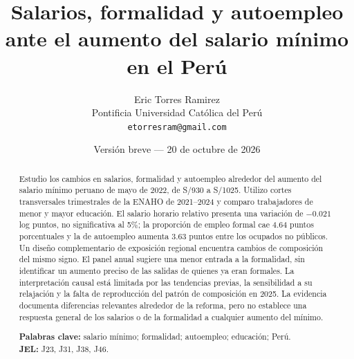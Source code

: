 \documentclass[12pt]{article}
\title{\textbf{Salarios, formalidad y autoempleo ante el aumento del salario mínimo en el Perú}}
\author{Eric Torres Ramirez\\\small Pontificia Universidad Católica del Perú\\\small\texttt{etorresram@gmail.com}}
\date{Versión breve --- 20 de octubre de 2026}
\begin{document}
\maketitle
\begin{abstract}
\noindent Estudio los cambios en salarios, formalidad y autoempleo alrededor del aumento del salario mínimo peruano de mayo de 2022, de S/930 a S/1025. Utilizo cortes transversales trimestrales de la ENAHO de 2021--2024 y comparo trabajadores de menor y mayor educación. El salario horario relativo presenta una variación de $-0.021$ log puntos, no significativa al 5\%; la proporción de empleo formal cae 4.64 puntos porcentuales y la de autoempleo aumenta 3.63 puntos entre los ocupados no públicos. Un diseño complementario de exposición regional encuentra cambios de composición del mismo signo. El panel anual sugiere una menor entrada a la formalidad, sin identificar un aumento preciso de las salidas de quienes ya eran formales. La interpretación causal está limitada por las tendencias previas, la sensibilidad a su relajación y la falta de reproducción del patrón de composición en 2025. La evidencia documenta diferencias relevantes alrededor de la reforma, pero no establece una respuesta general de los salarios o de la formalidad a cualquier aumento del mínimo.
\medskip

\noindent\textbf{Palabras clave:} salario mínimo; formalidad; autoempleo; educación; Perú.\\
\noindent\textbf{JEL:} J23, J31, J38, J46.
\end{abstract}

\FloatBarrier

\clearpage
\appendix

\end{document}
